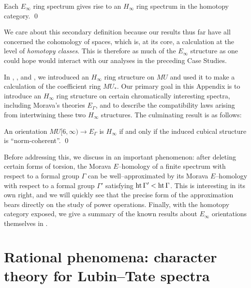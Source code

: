 \begin{lemma}
Each $E_\infty$ ring spectrum gives rise to an $H_\infty$ ring spectrum in the homotopy category. \qed
\end{lemma}

\noindent We care about this secondary definition because our results thus far have all concerned the cohomology of spaces, which is, at its core, a calculation at the level of \emph{homotopy classes}.  This is therefore as much of the $E_\infty$ structure as one could hope would interact with our analyses in the preceding Case Studies.

In , , and , we introduced an $H_\infty$ ring structure on $MU$ and used it to make a calculation of the coefficient ring $MU_*$.  Our primary goal in this Appendix is to introduce an $H_\infty$ ring structure on certain chromatically interesting spectra, including Morava's theories $E_\Gamma$, and to describe the compatibility laws arising from intertwining these two $H_\infty$ structures.  The culminating result is as follows:

\begin{theorem}
An orientation $MU[6, \infty) \to E_\Gamma$ is $H_\infty$ if and only if the induced cubical structure is ``norm-coherent''. \qed
\end{theorem}

\noindent Before addressing this, we discuss in  an important phenomenon: after deleting certain forms of torsion, the Morava $E$--homology of a finite spectrum with respect to a formal group $\Gamma$ can be well--approximated by its Morava $E$--homology with respect to a formal group $\Gamma'$ satisfying $\operatorname{ht}{\Gamma'} < \operatorname{ht}{\Gamma}$.  This is interesting in its own right, and we will quickly see that the precise form of the approximation bears directly on the study of power operations.  Finally, with the homotopy category exposed, we give a summary of the known results about $E_\infty$ orientations themselves in .













\section{Rational phenomena: character theory for Lubin--Tate spectra}\label{CharacterTheorySection}


